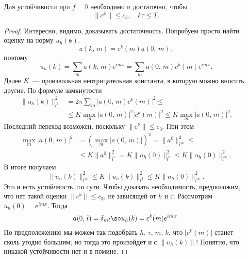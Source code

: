 \documentclass{trlnotes}
\begin{document}
    \begin{thm}
        Для устойчивости при $f = 0$ необходимо и достаточно, чтобы
        \[
            \|c^k\| \leqslant c_3, \quad k\tau \leqslant T.
        \]
        \begin{proof}
            Интересно, видимо, доказывать достаточность. Попробуем просто найти оценку на норму $u_h(k)$.
            \[
                a(k, \, m) = c^k(m)a(0, \, m),
            \]
            поэтому 
            \[
                u_h(k) = \sum\limits_m a(k, \, m) e^{imx} = \sum\limits_m a(0, \, m) c^k(m) e^{imx}.
            \]
            Далее $K$~--- произвольная неотрицательная константа, в которую можно вносить другие.
            По формуле замкнутости
            \begin{align*}
                \big\|u_h(k)\big\|_{l^2}^2 &= 2\pi \sum\limits_m \big|a(0, \, m) c^k(m)\big|^2 \leqslant \\ & \leqslant K \max\limits_{m} \big|a(0, \, m)\big|^2 \big|c^k(m)\big|^2 \leqslant  K \max\limits_m |a(0, \, m)\big|^2.
            \end{align*}
            Последний переход возможен, поскольку $\|c^k\| \leqslant c_3$.
            При этом
            \begin{align*}
                \max\limits_m |a(0, \, m)\big|^2 &= \left(\max\limits_m |a(0, \, m)\big|\right)^2 = \|a^0\|_{l^{\infty}}^2 \leqslant \\ &\leqslant K\|a^0\|_{l^2}^2 = K \big\|u_h(0)\big\|_{l^2}^2 \leqslant K\big\|u_h(0)\big\|_{l^{\infty}}^2.
            \end{align*}
            В итоге получаем
            \[
                \big\|u_h(k)\big\|_{l^{\infty}}^2 \leqslant K\big\|u_h(k)\big\|_{l^2}^2 \leqslant K\big\|u_h(0)\big\|_{l^{\infty}}^2.
            \]
            Это и есть устойчвость, по сути.
            Чтобы доказать необходимость, предположим, что нет такой оценки $\|c^k\| \leqslant c_3$, не зависящей от $h$ и $\tau$. Рассмотрим $u_h(0) = e^{imx}$. Тогда
            \[
                a(0, \, l) = \delta_{ml} \so u_h(k) = c^k(m)e^{imx}.
            \]
            По предположению мы можем так подобрать $h, \, \tau, \, m, \, k$, что $\big|c^k(m)\big|$ станет сколь угодно большим; но тогда это произойдёт и с $\|u_h(k)\|$! Понятно, что никакой устойчивости нет и в помине.
        \end{proof}
    \end{thm}
\end{document}
